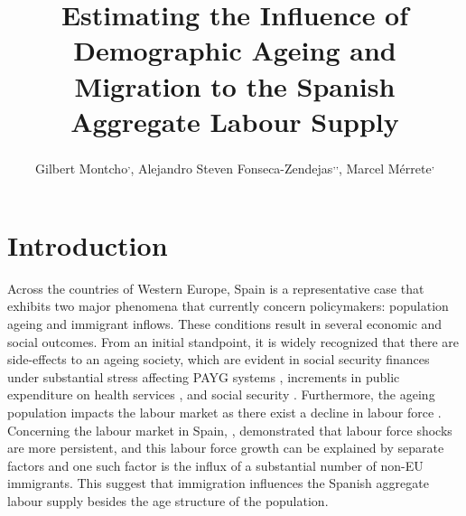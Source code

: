 \documentclass{article}
\title{\textbf{Estimating the Influence of Demographic Ageing and Migration to the Spanish Aggregate Labour Supply}}
\author{
  Gilbert Montcho\textsuperscript{\affiliationA,\equalcontributor},
  Alejandro Steven Fonseca-Zendejas\textsuperscript{\affiliationB,\equalcontributor,\correspondingA},
  Marcel Mérrete\textsuperscript{\affiliationC,\equalcontributor}
}
\makeatletter
\newcommand{\myfnsymbol}[1]{%
  \expandafter\@myfnsymbol\csname c@#1\endcsname
}
\newcommand{\@myfnsymbol}[1]{%
  \ifcase #1
  \or 1%
  \or 2%
  \or 3%
  \or \TextOrMath{\textasteriskcentered}{*}%
  \or \TextOrMath{\textdagger}{\dagger}%
  \fi
}
\makeatother
\begin{document}
\renewcommand{\thefootnote}{\myfnsymbol{footnote}}
\maketitle

%
%
%
%
%

\setcounter{footnote}{0}%
\renewcommand{\thefootnote}{\fnsymbol{footnote}}

\begin{abstract}
    
\end{abstract}

\section*{Introduction}

Across the countries of Western Europe, Spain is a representative case that exhibits two major phenomena that currently concern policymakers: population ageing and immigrant inflows. These conditions result in several economic and social outcomes. From an initial standpoint, it is widely recognized that there are side-effects to an ageing society, which are evident in social security finances under substantial stress affecting PAYG systems \cite{ diaz2009delaying,boeri2024pay}, increments in public expenditure on health services \cite{cristea2020impact, aiyar2016impact, bijak2007population}, and social security \cite{failde2021perspective}. Furthermore, the ageing population impacts the labour market as there exist a decline in labour force \cite{maestas2023effect}. Concerning the labour market in Spain, \cite{casares2018labor}, demonstrated that labour force shocks are more persistent, and this labour force growth can be explained by separate factors and one such factor is the influx of a substantial number of non-EU immigrants. This suggest that immigration influences the Spanish aggregate labour supply besides the age structure of the population. \\
\end{document}

